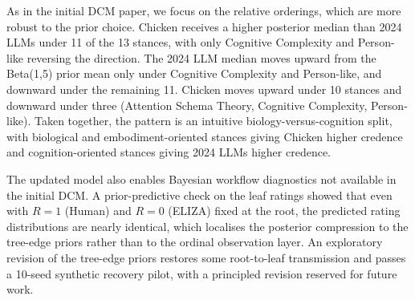 As in the initial DCM paper, we focus on the relative orderings, which are more robust to the prior choice. Chicken receives a higher posterior median than 2024 LLMs under 11 of the 13 stances, with only Cognitive Complexity and Person-like reversing the direction. The 2024 LLM median moves upward from the Beta(1,5) prior mean only under Cognitive Complexity and Person-like, and downward under the remaining 11. Chicken moves upward under 10 stances and downward under three (Attention Schema Theory, Cognitive Complexity, Person-like). Taken together, the pattern is an intuitive biology-versus-cognition split, with biological and embodiment-oriented stances giving Chicken higher credence and cognition-oriented stances giving 2024 LLMs higher credence.

The updated model also enables Bayesian workflow diagnostics not available in the initial DCM. A prior-predictive check on the leaf ratings showed that even with $R=1$ (Human) and $R=0$ (ELIZA) fixed at the root, the predicted rating distributions are nearly identical, which localises the posterior compression to the tree-edge priors rather than to the ordinal observation layer. An exploratory revision of the tree-edge priors restores some root-to-leaf transmission and passes a 10-seed synthetic recovery pilot, with a principled revision reserved for future work.

%
